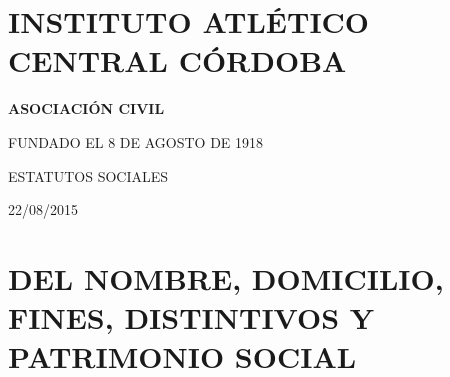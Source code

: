 \documentclass[openany]{book}
\title{}
\author{}
\date{}
\begin{document}
{
\setcounter{tocdepth}{1}
\tableofcontents
}
\hypertarget{instituto-atletico-central-cordoba}{%
\chapter*{INSTITUTO ATLÉTICO CENTRAL CÓRDOBA}\label{instituto-atletico-central-cordoba}}

\textbf{ASOCIACIÓN CIVIL}

FUNDADO EL 8 DE AGOSTO DE 1918

ESTATUTOS SOCIALES

22/08/2015

\hypertarget{cap1}{%
\chapter{DEL NOMBRE, DOMICILIO, FINES, DISTINTIVOS Y PATRIMONIO SOCIAL}\label{cap1}}
\end{document}
